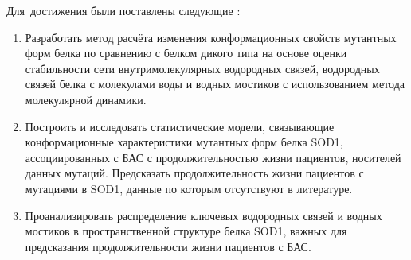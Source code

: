 Для~достижения были поставлены следующие {\tasks}:
\begin{enumerate}
  \item Разработать метод расчёта изменения конформационных свойств мутантных форм белка по сравнению с белком дикого типа на основе оценки стабильности сети внутримолекулярных водородных связей, водородных связей белка с молекулами воды и водных мостиков с использованием метода молекулярной динамики.
  \item Построить и исследовать статистические модели, связывающие конформационные характеристики мутантных форм белка SOD1, ассоциированных с БАС с продолжительностью жизни пациентов, носителей данных мутаций. Предсказать продолжительность жизни пациентов с мутациями в SOD1, данные по которым отсутствуют в литературе.
  \item Проанализировать распределение ключевых водородных связей и водных мостиков в пространственной структуре белка SOD1, важных для предсказания продолжительности жизни пациентов с БАС.
\end{enumerate}


